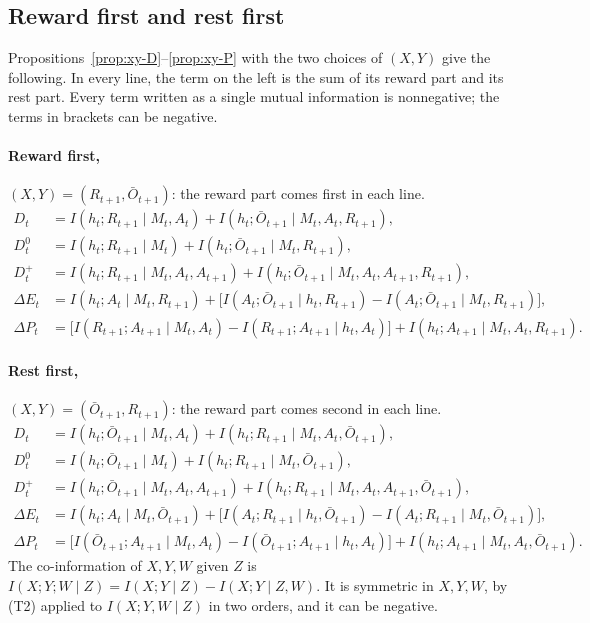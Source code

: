 \documentclass{article}
\theoremstyle{definition}
\theoremstyle{remark}
\newcommand{\dE}{\Delta E}
\newcommand{\dP}{\Delta P}
\newcommand{\Ob}{\bar O}
\begin{document}
\subsection{Reward first and rest first}

Propositions~\ref{prop:xy-D}--\ref{prop:xy-P} with the two choices of $(X,Y)$ give the following. In every line, the term on the left is the sum of its reward part and its rest part. Every term written as a single mutual information is nonnegative; the terms in brackets can be negative.

\paragraph{Reward first,} $(X,Y)=(R_{t+1},\Ob_{t+1})$: the reward part comes first in each line.
\begin{align*}
D_t&=I(h_t;R_{t+1}\mid M_t,A_t)+I(h_t;\Ob_{t+1}\mid M_t,A_t,R_{t+1}),\\
D^0_t&=I(h_t;R_{t+1}\mid M_t)+I(h_t;\Ob_{t+1}\mid M_t,R_{t+1}),\\
D^+_t&=I(h_t;R_{t+1}\mid M_t,A_t,A_{t+1})+I(h_t;\Ob_{t+1}\mid M_t,A_t,A_{t+1},R_{t+1}),\\
\dE_t&=I(h_t;A_t\mid M_t,R_{t+1})+\big[I(A_t;\Ob_{t+1}\mid h_t,R_{t+1})-I(A_t;\Ob_{t+1}\mid M_t,R_{t+1})\big],\\
\dP_t&=\big[I(R_{t+1};A_{t+1}\mid M_t,A_t)-I(R_{t+1};A_{t+1}\mid h_t,A_t)\big]+I(h_t;A_{t+1}\mid M_t,A_t,R_{t+1}).
\end{align*}

\paragraph{Rest first,} $(X,Y)=(\Ob_{t+1},R_{t+1})$: the reward part comes second in each line.
\begin{align*}
D_t&=I(h_t;\Ob_{t+1}\mid M_t,A_t)+I(h_t;R_{t+1}\mid M_t,A_t,\Ob_{t+1}),\\
D^0_t&=I(h_t;\Ob_{t+1}\mid M_t)+I(h_t;R_{t+1}\mid M_t,\Ob_{t+1}),\\
D^+_t&=I(h_t;\Ob_{t+1}\mid M_t,A_t,A_{t+1})+I(h_t;R_{t+1}\mid M_t,A_t,A_{t+1},\Ob_{t+1}),\\
\dE_t&=I(h_t;A_t\mid M_t,\Ob_{t+1})+\big[I(A_t;R_{t+1}\mid h_t,\Ob_{t+1})-I(A_t;R_{t+1}\mid M_t,\Ob_{t+1})\big],\\
\dP_t&=\big[I(\Ob_{t+1};A_{t+1}\mid M_t,A_t)-I(\Ob_{t+1};A_{t+1}\mid h_t,A_t)\big]+I(h_t;A_{t+1}\mid M_t,A_t,\Ob_{t+1}).
\end{align*}
The co-information of $X,Y,W$ given $Z$ is $I(X;Y;W\mid Z)=I(X;Y\mid Z)-I(X;Y\mid Z,W)$. It is symmetric in $X,Y,W$, by (T2) applied to $I(X;Y,W\mid Z)$ in two orders, and it can be negative.
\end{document}
